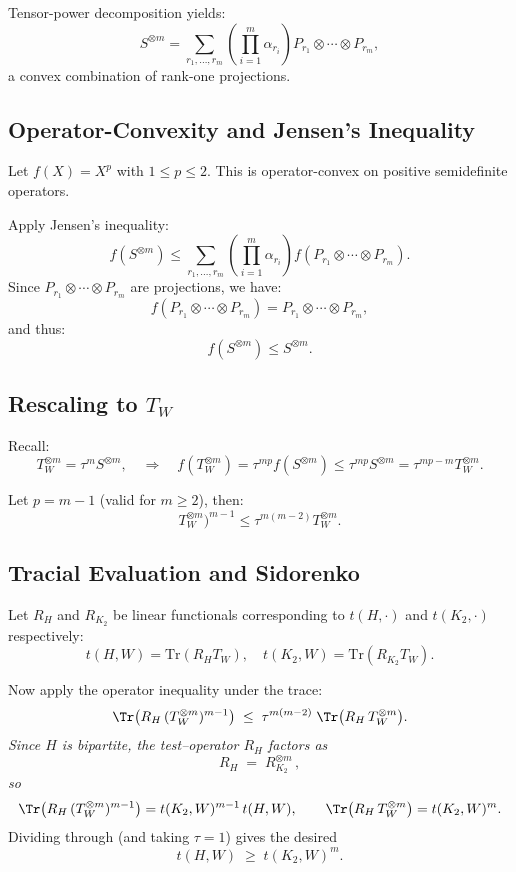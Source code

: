 \documentclass[11pt]{article}
\theoremstyle{definition}
\theoremstyle{plain}
\theoremstyle{remark}
\begin{document}
Tensor-power decomposition yields:
\[
S^{\otimes m} = \sum_{r_1,\dots,r_m} \left(\prod_{i=1}^m \alpha_{r_i}\right) P_{r_1} \otimes \cdots \otimes P_{r_m},
\]
a convex combination of rank-one projections.

\subsection*{Operator-Convexity and Jensen’s Inequality}

Let $f(X) = X^p$ with $1 \le p \le 2$. This is operator-convex on positive semidefinite operators.

Apply Jensen’s inequality:
\[
f(S^{\otimes m}) \le \sum_{r_1,\dots,r_m} \left(\prod_{i=1}^m \alpha_{r_i}\right) f(P_{r_1} \otimes \cdots \otimes P_{r_m}).
\]
Since $P_{r_1} \otimes \cdots \otimes P_{r_m}$ are projections, we have:
\[
f(P_{r_1} \otimes \cdots \otimes P_{r_m}) = P_{r_1} \otimes \cdots \otimes P_{r_m},
\]
and thus:
\[
f(S^{\otimes m}) \le S^{\otimes m}.
\]

\subsection*{Rescaling to $T_W$}

Recall:
\[
T_W^{\otimes m} = \tau^m S^{\otimes m}, \quad \Rightarrow \quad f(T_W^{\otimes m}) = \tau^{mp} f(S^{\otimes m}) \le \tau^{mp} S^{\otimes m} = \tau^{mp - m} T_W^{\otimes m}.
\]

Let $p = m - 1$ (valid for $m \ge 2$), then:
\[
T_W^{\otimes m})^{m - 1} \le \tau^{m(m - 2)} T_W^{\otimes m}.
\]

\subsection*{Tracial Evaluation and Sidorenko}

Let $R_H$ and $R_{K_2}$ be linear functionals corresponding to $t(H,\cdot)$ and $t(K_2,\cdot)$ respectively:
\[
t(H, W) = \mathrm{Tr}(R_H T_W), \quad t(K_2, W) = \mathrm{Tr}(R_{K_2} T_W).
\]

Now apply the operator inequality under the trace:
\[
\Tr\bigl(R_H\,(T_W^{\otimes m})^{m-1}\bigr)
\;\le\;
\tau^{m(m-2)}\;\Tr\bigl(R_H\,T_W^{\otimes m}\bigr).
\]
\emph{Since \(H\) is bipartite, the test–operator \(R_H\) factors as}
\[
R_H \;=\; R_{K_2}^{\otimes m}\,,
\]
\emph{so}
\[
\Tr\bigl(R_H\,(T_W^{\otimes m})^{m-1}\bigr)
= t(K_2,W)^{m-1}\,t(H,W),
\qquad
\Tr\bigl(R_H\,T_W^{\otimes m}\bigr)
= t(K_2,W)^m.
\]
Dividing through (and taking \(\tau=1\)) gives the desired
\[
t(H,W)\;\ge\;t(K_2,W)^m.
\]
\end{document}
